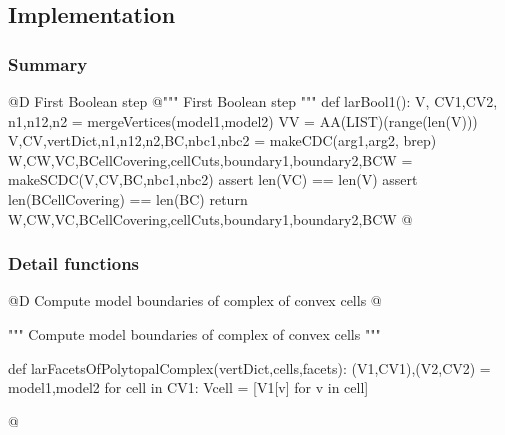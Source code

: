 \documentclass[11pt,oneside]{article}	%
\begin{document}
\subsection{Implementation}


\subsubsection{Summary}

@D First Boolean step
@{""" First Boolean step """
def larBool1():
	V, CV1,CV2, n1,n12,n2 = mergeVertices(model1,model2)
	VV = AA(LIST)(range(len(V)))
	V,CV,vertDict,n1,n12,n2,BC,nbc1,nbc2 = makeCDC(arg1,arg2, brep)
	W,CW,VC,BCellCovering,cellCuts,boundary1,boundary2,BCW = makeSCDC(V,CV,BC,nbc1,nbc2)
	assert len(VC) == len(V) 
	assert len(BCellCovering) == len(BC)
	return W,CW,VC,BCellCovering,cellCuts,boundary1,boundary2,BCW 
@}

\subsubsection{Detail functions}


@D Compute model boundaries of complex of convex cells
@{""" Compute model boundaries of complex of convex cells """

def larFacetsOfPolytopalComplex(vertDict,cells,facets):
	(V1,CV1),(V2,CV2) = model1,model2
	for cell in CV1:
		Vcell = [V1[v] for v in cell]

@}
\end{document}
